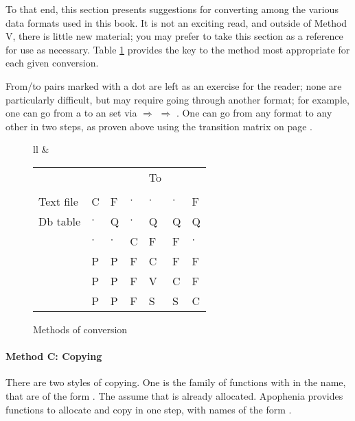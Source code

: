 To that end, this section presents
suggestions for converting among the various data formats used in this
book. It is not an exciting
read, and outside of Method V, there is little new material; you may
prefer to take this section as a reference for use as necessary. Table
\ref{conversiontab} provides the key to the method most appropriate for
each given conversion. 

From/to pairs marked with a dot are
left as an exercise for the reader; none are particularly difficult, but
may require going through another format; for example, one can go from a
 to an  set via  $\Rightarrow$  $\Rightarrow$ .
One can go from any format to any other in two steps, as proven above
using the transition matrix on page \pageref{twostep}. 

\def\rcap#1{\rotatebox{45}{#1}\hskip -15pt }
\def\rcapc#1{\rotatebox{45}{\cinline{#1}}\hskip -15pt }
\def\cd{$\cdot$}
\begin{figure} \begin{center}
\begin{tabular}{ll}
&
\begin{tabular}{lp{0.4cm}p{0.4cm}p{0.4cm}p{0.4cm}p{0.4cm}p{0.4cm}}
   &   &&&To\\
    & \rcap{Text file} & \rcap{Db table} & \rcapc{double[]} 
        & \rcapc{gsl\_vector} & \rcapc{gsl\_matrix}& \rcapc{apop\_data}\\
Text file               & C & F & \cd & \cd & \cd &  F                   \\
Db table                & \cd & Q & \cd & Q & Q & Q                  \\
\cinline{double[ ]}      & \cd & \cd & C & F & F & \cd                  \\
\cinline{gsl\_vector}   & P  & P & F & C & F & F                    \\
\cinline{gsl\_matrix}   &  P & P & F & V &C &  F               \\
\cinline{apop\_data}    & P & P & F & S & S &C
\end{tabular}
\end{tabular}
\caption{Methods of conversion} \label{conversiontab}
\end{center}\end{figure} 


\paragraph{Method C: Copying} There are two styles of copying.
One is the family of functions with  in the name, that are
of the form . The assume that 
is already allocated.  
Apophenia provides functions to allocate and copy in one step, with
names of the form .

